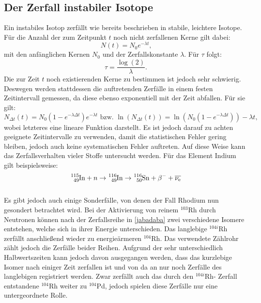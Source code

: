  \subsection{Der Zerfall instabiler Isotope}
 Ein instabiles Isotop zerfällt wie bereits beschrieben in stabile, leichtere Isotope. Für die Anzahl der zum Zeitpunkt $t$ noch nicht zerfallenen Kerne gilt dabei:
 \begin{equation}
   N(t) = N_0 e^{-\lambda t}\text{,}
   \end{equation}
mit den anfänglichen Kernen $N_0$ und der Zerfallskonstante $\lambda$.
Für $\tau$ folgt:
\begin{equation}
  \tau = \frac{\log(2)}{\lambda}\text{.}\label{T}
\end{equation}
Die zur Zeit $t$ noch existierenden Kerne zu bestimmen ist jedoch sehr schwierig.
Deswegen werden stattdessen die auftretenden Zerfälle in einem festen Zeitintervall gemessen, da diese ebenso exponentiell mit der Zeit abfallen. Für sie gilt:
\begin{equation}
  N_{\Delta t}(t) = N_0 \left(1 - e^{-\lambda \Delta t}\right)e^{- \lambda t} \text{  bzw.  } \ln \left( N_{\Delta t}(t) \right) = \ln \left( N_0(1- e^{- \lambda \Delta t}) \right) - \lambda t \text{,}
\end{equation}
wobei letzteres eine lineare Funktion darstellt.
Es ist jedoch darauf zu achten geeignete Zeitintervalle zu verwenden, damit die statistischen Fehler gering bleiben, jedoch auch keine systematischen Fehler auftreten.
Auf diese Weise kann das Zerfallsverhalten vieler Stoffe untersucht werden. Für das Element Indium gilt beispielsweise:
\begin{equation}
  \ce{^{115}_{49}In} +n \rightarrow \ce{^{116}_{49}In} \rightarrow \ce{^{116}_{50}Sn} + \beta^- + \overline{\nu_\text{e}}
\end{equation}\\
Es gibt jedoch auch einige Sonderfälle, von denen der Fall Rhodium nun gesondert betrachtet wird.
Bei der Aktivierung von reinem $^{103}$Rh durch Neutronen können nach der Zerfallsreihe in \eqref{jabadaba}
zwei verschiedene Isomere entstehen, welche sich in ihrer Energie unterschieden. Das langlebige $^{104i}$Rh zerfällt anschließend wieder zu energieärmeren $^{104}$Rh.
Das verwendete Zählrohr zählt jedoch die Zerfälle beider Reihen. Aufgrund der sehr unterschiedlich Halbwertszeiten kann jedoch davon ausgegangen werden, dass das kurzlebige Isomer nach einiger Zeit zerfallen ist und von da an nur noch Zerfälle des langlebigen registriert werden. Zwar zerfällt auch das durch den $^{104i}$Rh- Zerfall entstandene $^{104}$Rh weiter zu $^{104}$Pd, jedoch spielen diese Zerfälle nur eine untergeordnete Rolle.
